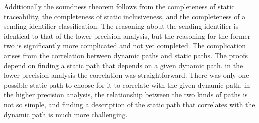 \documentclass[letterpaper, 11pt]{extarticle}
\begin{document}
Additionally the soundness theorem follows from the completeness of static traceability,
the completeness of static inclusiveness, and the completeness of a sending identifier classification. 
The reasoning about the sending identifier is identical to that of the lower precision analysis, but
the reasoning for the former two is significantly more complicated and not yet completed.
The complication arises from the
correlation between dynamic paths and static paths.  The proofs depend on finding a static 
path that depends on a given dynamic path. in the lower precision analysis the
correlation was straightforward. There was only one possible static path to choose for it
to correlate with the given dynamic path. in the higher precision analysis, the relationship
between the two kinds of paths is not so simple, and finding a description of the static path
that correlates with the dynamic path is much more challenging.
\end{document}
